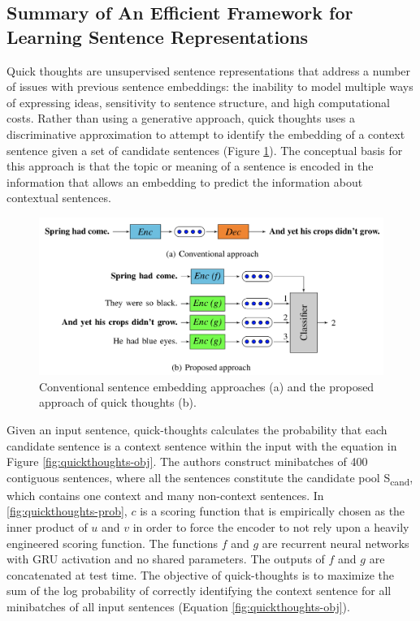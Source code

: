 \subsection{Summary of An Efficient Framework for Learning Sentence Representations}

Quick thoughts  \cite{logeswaran2018an} are unsupervised sentence representations that address a number of issues with previous sentence embeddings: the inability to model multiple ways of expressing ideas, sensitivity to sentence structure, and high computational costs. Rather than using a generative approach, quick thoughts uses a discriminative approximation to attempt to identify the embedding of a context sentence given a set of candidate sentences (Figure \ref{fig:quickthoughts-1}). The conceptual basis for this approach is that the topic or meaning of a sentence is encoded in the information that allows an embedding to predict the information about contextual sentences. 


\begin{figure}[h!]
\centering
  \includegraphics[width=.8\linewidth]{files/quickthoughts-1.png}
  \caption{Conventional sentence embedding approaches (a) and the proposed approach of quick thoughts (b).}
  \label{fig:quickthoughts-1}
\end{figure}

Given an input sentence, quick-thoughts calculates the probability that each candidate sentence is a context sentence within the input with the equation in Figure \ref{fig:quickthoughts-obj}. The authors construct minibatches of 400 contiguous sentences, where all the sentences constitute the candidate pool S\textsubscript{cand}, which contains one context and many non-context sentences. In \ref{fig:quickthoughts-prob}, $c$ is a scoring function that is empirically chosen as the inner product of $u$ and $v$ in order to force the encoder to not rely upon a heavily engineered scoring function. The functions $f$ and $g$ are recurrent neural networks with GRU activation and no shared parameters. The outputs of $f$ and $g$ are concatenated at test time. The objective of quick-thoughts is to maximize the sum of the log probability of correctly identifying the context sentence for all minibatches of all input sentences (Equation \ref{fig:quickthoughts-obj}).



